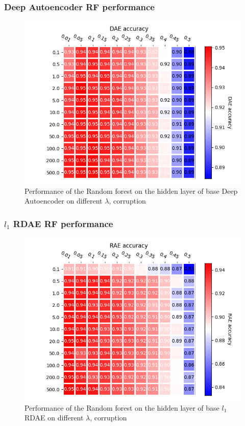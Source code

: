 \documentclass{beamer}
\theoremstyle{plain}
\theoremstyle{definition}
\theoremstyle{remark}
\begin{document}
\begin{frame}
	\frametitle{Deep Autoencoder RF performance}
	\begin{figure}
		\centering
		\includegraphics[width=0.7\linewidth]{Images/DAE_acc.png}
		\caption[]{Performance of the Random forest on the hidden layer of base Deep Autoencoder on different $\lambda$, corruption}
	\end{figure}
\end{frame}

\begin{frame}
	\frametitle{$l_1$ RDAE RF performance}
	\begin{figure}
		\centering
		\includegraphics[width=0.7\linewidth]{Images/RAE_acc.png}
		\caption[]{Performance of the Random forest on the hidden layer of base $l_1$ RDAE on different $\lambda$, corruption}
	\end{figure}
\end{frame}
\end{document}
